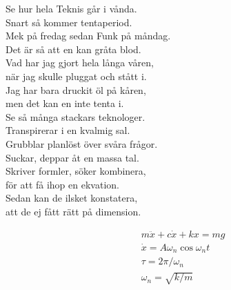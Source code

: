 \documentclass[a6paper, 10pt, twoside]{article}
\begin{document}
\noindent
\begin{center}
\end{center}
\begin{lyrics}
Se hur hela Teknis går i vånda. \\
Snart så kommer tentaperiod. \\
Mek på fredag sedan Funk på måndag. \\
Det är så att en kan gråta blod. 
\vspace{5pt} \\
Vad har jag gjort hela långa våren, \\
när jag skulle pluggat och stått i. \\
Jag har bara druckit öl på kåren, \\
men det kan en inte tenta i. 
\vspace{5pt} \\
Se så många stackars teknologer. \\
Transpirerar i en kvalmig sal. \\
Grubblar planlöst över svåra frågor. \\
Suckar, deppar åt en massa tal. 
\vspace{5pt} \\
Skriver formler, söker kombinera, \\
för att få ihop en ekvation. \\
Sedan kan de ilsket konstatera, \\
att de ej fått rätt på dimension. 
\end{lyrics}

\begin{flushright}
\large
\begin{align*}
&m\ddot{x} + c\dot{x} + kx = mg \\
&\dot{x} = A\omega_n\cos{\omega_nt}\\
&\tau = 2\pi/\omega_n\\
&\omega_n = \sqrt{k/m}
\end{align*}
\end{flushright}
\end{document}
